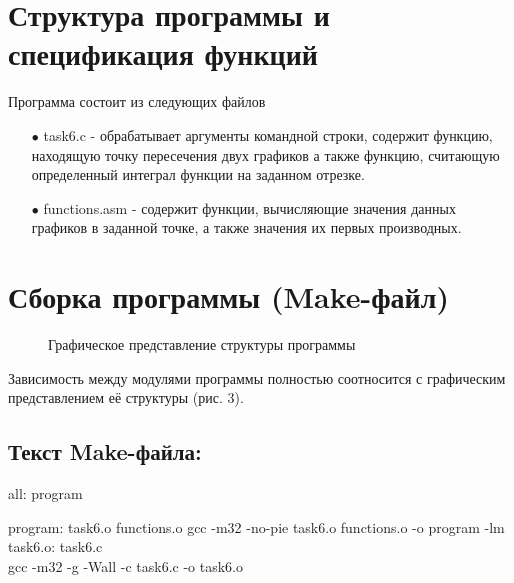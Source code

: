 \documentclass[a4paper,12pt,titlepage,finall]{article}
\begin{document}
\newpage

\section{Структура программы и спецификация функций}

Программа состоит из следующих файлов
    \begin{itemize}
      \item[$\bullet$] task6.c - обрабатывает аргументы командной строки, содержит функцию, находящую точку пересечения двух графиков а также функцию, считающую определенный интеграл функции на заданном отрезке.
      \item[$\bullet$] functions.asm - содержит функции, вычисляющие значения данных графиков в заданной точке, а также значения их первых производных.
    \end{itemize}

\newpage

\section{Сборка программы (Make-файл)}

\begin{figure}[h]
\caption{Графическое представление структуры программы}
\label{graph1}
\end{figure}

Зависимость между модулями программы полностью соотносится с графическим 
представлением её структуры (рис. 3). \\
\subsection{Текст Make-файла:}
all: program\newline

program: task6.o functions.o\newline
	\hspace{10cm} {gcc -m32 -no-pie task6.o functions.o -o program -lm} \\

task6.o: task6.c\\
	\hspace{1.5cm} gcc -m32 -g -Wall -c task6.c -o task6.o\\
\end{document}
